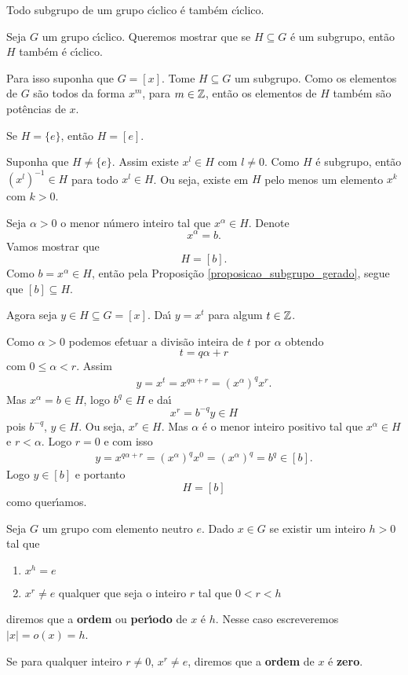 \begin{proposicao}
    Todo subgrupo de um grupo c{\'\i}clico \'e tamb\'em c{\'\i}clico.
\end{proposicao}
\begin{prova}
    Seja $G$ um grupo c{\'\i}clico. Queremos mostrar que se $H \subseteq G$ \'e um subgrupo, ent\~ao $H$ tamb\'em \'e c{\'\i}clico.

    Para isso suponha que $G = [x]$. Tome $H \subseteq G$ um subgrupo. Como os elementos de $G$ s\~ao todos da forma $x^m$, para $m \in \mathbb{Z}$, ent\~ao os elementos de $H$ tamb\'em s\~ao pot\^encias de $x$.

    Se $H = \{e\}$, ent\~ao $H = [e]$.

    Suponha que $H \ne \{e\}$. Assim existe $x^l \in H$ com $l \ne 0$. Como $H$ \'e subgrupo, ent\~ao $(x^l)^{-1} \in H$ para todo $x^l \in H$. Ou seja, existe em $H$ pelo menos um elemento $x^k$ com $k > 0$.

    Seja $\alpha > 0$ o menor n\'umero inteiro tal que $x^\alpha \in H$. Denote
    \[
        x^\alpha = b.
    \]
    Vamos mostrar que
    \[
        H = [b].
    \]
    Como $b = x^\alpha \in H$, ent\~ao pela Proposi\c{c}\~ao \eqref{proposicao_subgrupo_gerado}, segue que $[b] \subseteq H$.

    Agora seja $y \in H \subseteq G = [x]$. Da{\'\i} $y = x^t$ para algum $t \in \mathbb{Z}$.

    Como $\alpha > 0$ podemos efetuar a divis\~ao inteira de $t$ por $\alpha$ obtendo
    \[
        t = q\alpha + r
    \]
    com $0 \le \alpha < r$. Assim
    \begin{align*}
        y = x^t = x^{q\alpha + r} = (x^{\alpha})^qx^r.
    \end{align*}
    Mas $x^\alpha = b \in H$, logo $b^q \in H$ e da{\'\i}
    \[
        x^r = b^{-q}y\in H
    \]
    pois $b^{-q}$, $y \in H$. Ou seja, $x^r \in H$. Mas $\alpha$ \'e o menor inteiro positivo tal que $x^\alpha \in H$ e $r < \alpha$. Logo $r = 0$ e com isso
    \begin{align*}
        y = x^{q\alpha + r} = (x^{\alpha})^qx^0 = (x^{\alpha})^q = b^q \in [b].
    \end{align*}
    Logo $y \in [b]$ e portanto
    \[
        H = [b]
    \]
    como quer{\'\i}amos.
\end{prova}

\begin{definicao}
    Seja $G$ um grupo com elemento neutro $e$. Dado $x \in G$ se existir um inteiro $h > 0$ tal que
    \begin{enumerate}[label={\roman*})]
        \item $x^h = e$
        \item $x^r \ne e$ qualquer que seja o inteiro $r$ tal que $0 < r < h$
    \end{enumerate}
    diremos que a \textbf{ordem} ou \textbf{per{\'\i}odo} de $x$ \'e $h$. Nesse caso escreveremos $|x| = o(x) = h$.

    Se para qualquer inteiro $r \ne 0$, $x^r \ne e$, diremos que a \textbf{ordem} de $x$ \'e \textbf{zero}.
\end{definicao}

